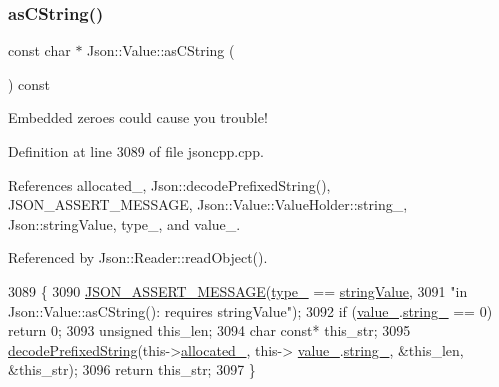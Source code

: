 \subsubsection{\texorpdfstring{as\+C\+String()}{asCString()}}
{\footnotesize\ttfamily const char $\ast$ Json\+::\+Value\+::as\+C\+String (\begin{DoxyParamCaption}{ }\end{DoxyParamCaption}) const}



Embedded zeroes could cause you trouble! 



Definition at line 3089 of file jsoncpp.\+cpp.



References allocated\+\_\+, Json\+::decode\+Prefixed\+String(), J\+S\+O\+N\+\_\+\+A\+S\+S\+E\+R\+T\+\_\+\+M\+E\+S\+S\+A\+GE, Json\+::\+Value\+::\+Value\+Holder\+::string\+\_\+, Json\+::string\+Value, type\+\_\+, and value\+\_\+.



Referenced by Json\+::\+Reader\+::read\+Object().


\begin{DoxyCode}
3089                                    \{
3090   \hyperlink{json_8h_ad7facdeeca0f495765e3b204c265eadb}{JSON\_ASSERT\_MESSAGE}(\hyperlink{class_json_1_1_value_abd222c2536dc88bf330dedcd076d2356}{type\_} == \hyperlink{namespace_json_a7d654b75c16a57007925868e38212b4ea804ef857affea2d415843c73f261c258}{stringValue},
3091                       \textcolor{stringliteral}{"in Json::Value::asCString(): requires stringValue"});
3092   \textcolor{keywordflow}{if} (\hyperlink{class_json_1_1_value_aef578244546212705b9f81eb84d7e151}{value\_}.\hyperlink{union_json_1_1_value_1_1_value_holder_a70ac2b153bc405527baa3850d2ddc3cb}{string\_} == 0) \textcolor{keywordflow}{return} 0;
3093   \textcolor{keywordtype}{unsigned} this\_len;
3094   \textcolor{keywordtype}{char} \textcolor{keyword}{const}* this\_str;
3095   \hyperlink{namespace_json_aad8b4982c1acd164f541fba396ac9fb1}{decodePrefixedString}(this->\hyperlink{class_json_1_1_value_ae0126c80dc4907aad94088553fc7632b}{allocated\_}, this->
      \hyperlink{class_json_1_1_value_aef578244546212705b9f81eb84d7e151}{value\_}.\hyperlink{union_json_1_1_value_1_1_value_holder_a70ac2b153bc405527baa3850d2ddc3cb}{string\_}, &this\_len, &this\_str);
3096   \textcolor{keywordflow}{return} this\_str;
3097 \}
\end{DoxyCode}
\mbox{\label{class_json_1_1_value_afd24002a18aef907ad746b1cb9eda0a2}} 
